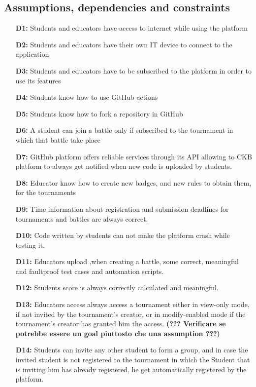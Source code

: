\documentclass{article}
\begin{document}
{    \subsection{Assumptions, dependencies and constraints}
        \begin{itemize}
            \item[\textbf{D1:}] Students and educators have access to internet while using the platform
            \item[\textbf{D2:}] Students and educators have their own IT device to connect to the application
            \item[\textbf{D3:}] Students and educators have to be subscribed to the platform in order to use its features
            \item[\textbf{D4:}] Students know how to use GitHub actions
            \item[\textbf{D5:}] Students know how to fork a repository in GitHub
            \item[\textbf{D6:}] A student can join a battle only if subscribed to the tournament in which that battle take place
            \item[\textbf{D7:}] GitHub platform offers reliable services through its API allowing to CKB platform to always get notified when new code is uploaded by students.
            \item[\textbf{D8:}] Educator know how to create new badges, and new rules to obtain them, for the tournaments
            \item[\textbf{D9:}] Time information about registration and submission deadlines for tournaments and battles are always correct.
            \item[\textbf{D10:}] Code written by students can not make the platform crash while testing it.
            \item[\textbf{D11:}] Educators upload ,when creating a battle, some correct, meaningful and faultproof test cases and automation scripts.
            \item[\textbf{D12:}] Students score is always correctly calculated and meaningful.
            \item[\textbf{D13:}] Educators access always access a tournament either in view-only mode, if not invited by the tournament's creator, or in modify-enabled mode if the tournament's creator has granted him the access.
            \textbf{(??? Verificare se potrebbe essere un goal piuttosto che una assumption ???)}
            \item[\textbf{D14:}] Students can invite any other student to form a group, and in case
            the invited student is not registered to the tournament in which the Student that is 
            inviting him has already registered, he get automatically registered by the platform.
        

\end{itemize}}
\end{document}
